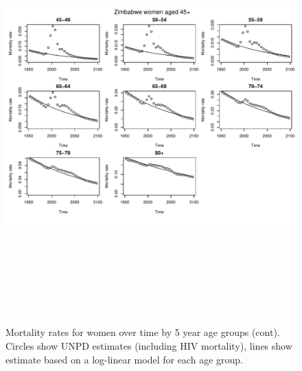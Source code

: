 \documentclass{article}
\begin{document}
\begin{figure}
\includegraphics[width=16cm,height=16cm]{EstimatingRatesFromUNPDv2-MortalityWomen2} 

\caption{Mortality rates for women over time by 5 year age groups (cont). Circles show UNPD estimates (including HIV mortality), lines show estimate based on a log-linear model for each age group.}
\label{Mortalitywomen1}
\end{figure}



\clearpage
\end{document}
